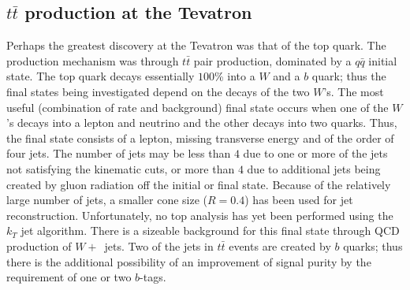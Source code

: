 \documentclass[12pt]{iopart}
\begin{document}
\subsection{$t\bar{t}$ production at the Tevatron}
\label{sec:tT_tev}

Perhaps the greatest discovery at the Tevatron was that of the top quark. The production mechanism was through
$t\bar{t}$ pair production, dominated by a $q\bar{q}$ initial state. The top quark decays essentially $100$\% into a
$W$ and a $b$ quark; thus the final states being investigated depend on the decays of the two $W$'s. The most useful
(combination of rate and background) final state occurs when one of the $W$'s decays into a lepton and neutrino and
the other decays into two quarks. Thus, the final state consists of a lepton, missing transverse energy and of the
order of four jets. The number of jets may be less than $4$ due to one or more of the jets not satisfying the
kinematic cuts, or more than $4$ due to additional jets being created by gluon radiation off the initial or final
state.  Because of the relatively large number of jets, a smaller cone size ($R=0.4$) has been used for jet
reconstruction. Unfortunately, no top analysis has yet been performed using the $k_T$ jet algorithm.  There is a
sizeable background for this final state through QCD production of $W +$~jets.  Two of the jets in $t\bar{t}$ events
are created by $b$ quarks; thus there is the additional possibility of an improvement of signal purity by the
requirement of one or two $b$-tags. 
\end{document}
